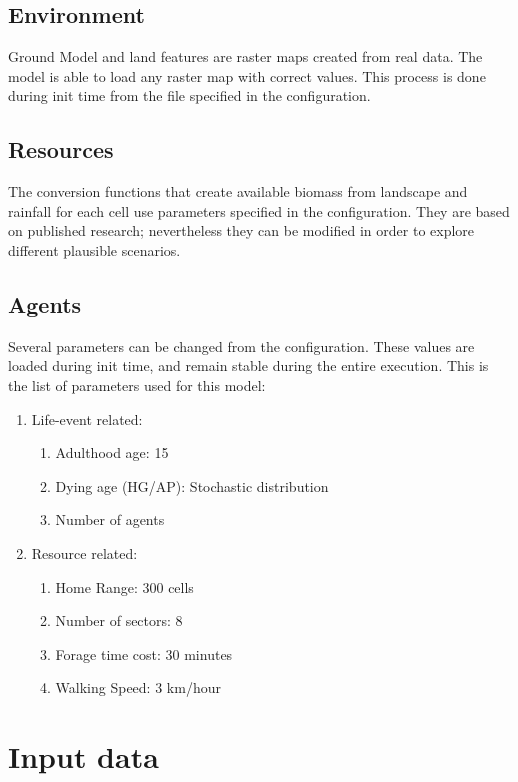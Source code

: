 \documentclass[11pt,oneside,a4paper,openright]{report}
\begin{document}
\subsection{Environment}
Ground Model and land features are raster maps created from real data. The
model is able to load any raster map with correct values. This process is done during init time from the
file specified in the configuration.


\subsection{Resources}
The conversion functions that create available biomass from landscape and rainfall for each cell use
parameters specified in the configuration. They are based on published research; nevertheless they
can be modified in order to explore different plausible scenarios.

\subsection{Agents}
Several parameters can be changed from the configuration. These values are loaded during init time,
and remain stable during the entire execution. This is the list of parameters used for this model:

\begin{enumerate}
	\item Life-event related:
	\begin{enumerate}
		\item Adulthood age: 15
		\item Dying age (HG/AP): Stochastic distribution %
		\item Number of agents 
	\end{enumerate}
	\item Resource related:
	\begin{enumerate}
		\item Home Range: 300 cells
		\item Number of sectors: 8
		\item Forage time cost: 30 minutes
		\item Walking Speed: 3 km/hour
	\end{enumerate}
\end{enumerate}


\section{Input data}
\end{document}

